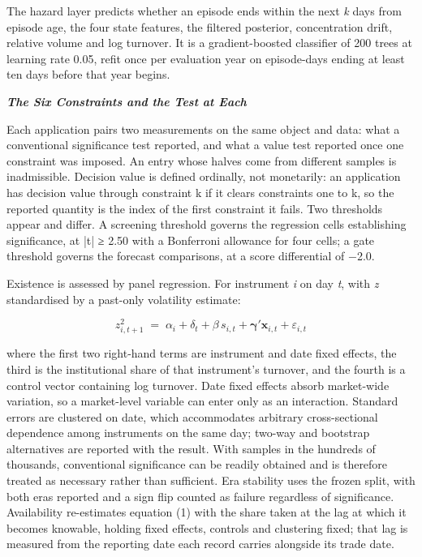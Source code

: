 \documentclass[12pt,a4paper]{article}
\newcommand{\subhead}[1]{%
  \par\vspace{6pt}\noindent\textbf{\textit{#1}}\par\vspace{1pt}}
\begin{document}
The hazard layer predicts whether an episode ends within the next \textit{k} days from episode age, the four state features, the filtered posterior, concentration drift, relative volume and log turnover. It is a gradient-boosted classifier of 200 trees at learning rate 0.05, refit once per evaluation year on episode-days ending at least ten days before that year begins.

\subhead{The Six Constraints and the Test at Each}

Each application pairs two measurements on the same object and data: what a conventional significance test reported, and what a value test reported once one constraint was imposed. An entry whose halves come from different samples is inadmissible. Decision value is defined ordinally, not monetarily: an application has decision value through constraint k if it clears constraints one to k, so the reported quantity is the index of the first constraint it fails. Two thresholds appear and differ. A screening threshold governs the regression cells establishing significance, at |t| ≥ 2.50 with a Bonferroni allowance for four cells; a gate threshold governs the forecast comparisons, at a score differential of −2.0.

Existence is assessed by panel regression. For instrument \textit{i} on day \textit{t}, with \textit{z} standardised by a past-only volatility estimate:

\begin{equation}
z^{2}_{i,t+1} \;=\; \alpha_{i} + \delta_{t} + \beta\, s_{i,t} + \boldsymbol{\gamma}'\mathbf{x}_{i,t} + \varepsilon_{i,t}
\end{equation}

where the first two right-hand terms are instrument and date fixed effects, the third is the institutional share of that instrument's turnover, and the fourth is a control vector containing log turnover. Date fixed effects absorb market-wide variation, so a market-level variable can enter only as an interaction. Standard errors are clustered on date, which accommodates arbitrary cross-sectional dependence among instruments on the same day; two-way and bootstrap alternatives are reported with the result. With samples in the hundreds of thousands, conventional significance can be readily obtained and is therefore treated as necessary rather than sufficient. Era stability uses the frozen split, with both eras reported and a sign flip counted as failure regardless of significance. Availability re-estimates equation (1) with the share taken at the lag at which it becomes knowable, holding fixed effects, controls and clustering fixed; that lag is measured from the reporting date each record carries alongside its trade date.
\end{document}
